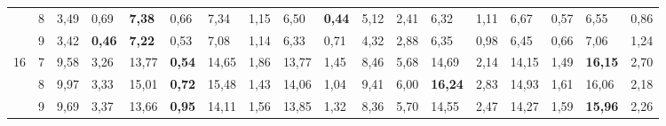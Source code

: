 \documentclass[conference]{IEEEtran}
\begin{document}
\begin{table}[]
\begin{tabular}{|cl|ll|ll|ll|ll|ll|ll|ll|ll|}
		\multicolumn{1}{|c|}{}                    & 8          & \multicolumn{1}{l|}{3,49}          & 0,69          & \multicolumn{1}{l|}{\textbf{7,38}}  & 0,66          & \multicolumn{1}{l|}{7,34}           & 1,15          & \multicolumn{1}{l|}{6,50}          & \textbf{0,44} & \multicolumn{1}{l|}{5,12}                 & 2,41 & \multicolumn{1}{l|}{6,32}           & 1,11 & \multicolumn{1}{l|}{6,67}           & 0,57          & \multicolumn{1}{l|}{6,55}           & 0,86 \\ \cline{2-18} 
		\multicolumn{1}{|c|}{}                    & 9          & \multicolumn{1}{l|}{3,42}          & \textbf{0,46} & \multicolumn{1}{l|}{\textbf{7,22}}  & 0,53          & \multicolumn{1}{l|}{7,08}           & 1,14          & \multicolumn{1}{l|}{6,33}          & 0,71          & \multicolumn{1}{l|}{4,32}                 & 2,88 & \multicolumn{1}{l|}{6,35}           & 0,98 & \multicolumn{1}{l|}{6,45}           & 0,66          & \multicolumn{1}{l|}{7,06}           & 1,24 \\ \hline
		\multicolumn{1}{|c|}{\multirow{3}{*}{16}} & 7          & \multicolumn{1}{l|}{9,58}          & 3,26          & \multicolumn{1}{l|}{13,77}          & \textbf{0,54} & \multicolumn{1}{l|}{14,65}          & 1,86          & \multicolumn{1}{l|}{13,77}         & 1,45          & \multicolumn{1}{l|}{8,46}                 & 5,68 & \multicolumn{1}{l|}{14,69}          & 2,14 & \multicolumn{1}{l|}{14,15}          & 1,49          & \multicolumn{1}{l|}{\textbf{16,15}} & 2,70 \\ \cline{2-18} 
		\multicolumn{1}{|c|}{}                    & 8          & \multicolumn{1}{l|}{9,97}          & 3,33          & \multicolumn{1}{l|}{15,01}          & \textbf{0,72} & \multicolumn{1}{l|}{15,48}          & 1,43          & \multicolumn{1}{l|}{14,06}         & 1,04          & \multicolumn{1}{l|}{9,41}                 & 6,00 & \multicolumn{1}{l|}{\textbf{16,24}} & 2,83 & \multicolumn{1}{l|}{14,93}          & 1,61          & \multicolumn{1}{l|}{16,06}          & 2,18 \\ \cline{2-18} 
		\multicolumn{1}{|c|}{}                    & 9          & \multicolumn{1}{l|}{9,69}          & 3,37          & \multicolumn{1}{l|}{13,66}          & \textbf{0,95} & \multicolumn{1}{l|}{14,11}          & 1,56          & \multicolumn{1}{l|}{13,85}         & 1,32          & \multicolumn{1}{l|}{8,36}                 & 5,70 & \multicolumn{1}{l|}{14,55}          & 2,47 & \multicolumn{1}{l|}{14,27}          & 1,59          & \multicolumn{1}{l|}{\textbf{15,96}} & 2,26 \\ \hline

\end{tabular}
\end{table}
\end{document}
